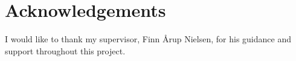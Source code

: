 \section*{Acknowledgements}
I would like to thank my supervisor, Finn \AA{}rup Nielsen, for his guidance and
support throughout this project.
